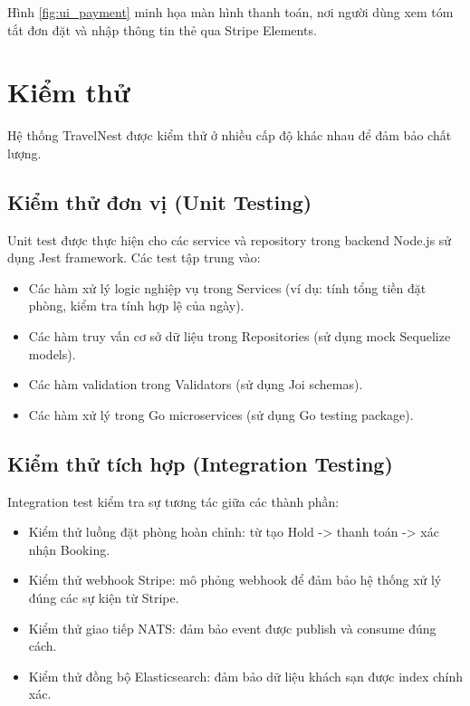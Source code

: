 \documentclass[13pt,a4paper,twoside]{report}
\begin{document}
Hình \ref{fig:ui_payment} minh họa màn hình thanh toán, nơi người dùng xem tóm tắt đơn đặt và nhập thông tin thẻ qua Stripe Elements.

\section{Kiểm thử}

Hệ thống TravelNest được kiểm thử ở nhiều cấp độ khác nhau để đảm bảo chất lượng.

\subsection{Kiểm thử đơn vị (Unit Testing)}

Unit test được thực hiện cho các service và repository trong backend Node.js sử dụng Jest framework. Các test tập trung vào:

\begin{itemize}
  \item Các hàm xử lý logic nghiệp vụ trong Services (ví dụ: tính tổng tiền đặt phòng, kiểm tra tính hợp lệ của ngày).
  \item Các hàm truy vấn cơ sở dữ liệu trong Repositories (sử dụng mock Sequelize models).
  \item Các hàm validation trong Validators (sử dụng Joi schemas).
  \item Các hàm xử lý trong Go microservices (sử dụng Go testing package).
\end{itemize}

\subsection{Kiểm thử tích hợp (Integration Testing)}

Integration test kiểm tra sự tương tác giữa các thành phần:

\begin{itemize}
  \item Kiểm thử luồng đặt phòng hoàn chỉnh: từ tạo Hold -> thanh toán -> xác nhận Booking.
  \item Kiểm thử webhook Stripe: mô phỏng webhook để đảm bảo hệ thống xử lý đúng các sự kiện từ Stripe.
  \item Kiểm thử giao tiếp NATS: đảm bảo event được publish và consume đúng cách.
  \item Kiểm thử đồng bộ Elasticsearch: đảm bảo dữ liệu khách sạn được index chính xác.
\end{itemize}
\end{document}
